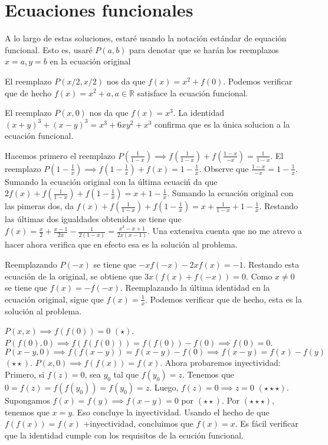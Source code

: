 \section{Ecuaciones funcionales}
A lo largo de estas soluciones, estar\'e usando la notaci\'on est\'andar de equaci\'on funcional. Esto es, usar\'e  $P(a,b)$ para denotar que se har\'an los reemplazos $x = a, y = b$ en la ecuaci\'on original
\begin{sol}
	El reemplazo $P(x/2, x/2)$ nos da que $f(x) = x^2+f(0)$. Podemos verificar que de hecho $f(x) = x^2+a, a \in \mathbb{R}$ satisface la ecuaci\'on funcional.
\end{sol}

\begin{sol}
	El reemplazo $P(x,0)$ nos da que $f(x) = x^3$. La identidad $(x+y)^3 + (x-y)^3 = x^3 +6xy^2+x^3$ confirma que es la \'unica solucion a la ecuaci\'on funcional.
\end{sol}

\begin{sol}
	Hacemos primero el reemplazo $P(\frac{1}{1-x}) \implies f(\frac{1}{1-x}) + f(\frac{1-x}{-x}) = \frac{1}{1-x} $. El reemplazo $P(1-\frac{1}{x}) \implies f(1-\frac{1}{x})+ f(x) = 1-\frac{1}{x}$. Observe que $\frac{1-x}{-x} = 1-\frac{1}{x}$. Sumando la ecuaci\'on original con la \'ultima ecuaci\'n da que $2f(x) + f(\frac{1}{1-x}) + f(1-\frac{1}{x}) = x+1-\frac{1}{x}$. Sumando la ecuaci\'on original con las pimeras dos, da $f(x) +f(\frac{1}{1-x}) + f(1-\frac{1}{x}) = x+\frac{1}{1-x} + 1-\frac{1}{x}$. Restando las \'ultimas dos igualdades obtenidas se tiene que $f(x) = \frac{x}{2} +\frac{x-1}{2x} - \frac{1}{2(1-x)} = \frac{x^3-x+1}{2x(x-1)}$. Una extensiva cuenta que no me atrevo a hacer ahora verifica que en efecto esa es la soluci\'on al problema.
\end{sol}

\begin{sol}
	Reemplazando $P(-x)$ se tiene que $-xf(-x)-2xf(x) =-1$. Restando esta ecuaci\'on de la original, se obtiene que $3x(f(x)+f(-x)) = 0$. Como $x \neq 0$ se tiene que $f(x) = -f(-x)$. Reemplazando la \'ultima identidad en la ecuaci\'on original, sigue que $f(x) = \frac{1}{x}$. Podemos verificar que de hecho, esta es la soluci\'on al problema.
\end{sol}

\begin{sol}
	$P(x,x) \implies f(f(0)) = 0$  $ (\star)$. $P(f(0), 0) \implies f(f(f(0))) = f(f(0)) -f(0) \implies f(0) = 0$. $P(x-y,0) \implies f(f(x-y)) = f(x-y) -f(0) \implies f(x-y) = f(x)-f(y)$ $(\star\star)$. $P(x,0) \implies f(f(x)) = f(x)$.  Ahora probaremos inyectividad: Primero, si $f(z) = 0$, sea $y_{0}$ tal que $f(y_{0}) = z$. Tenemos que $0 = f(z) = f(f(y_{0})) = f(y_{0}) = z$. Luego, $f(z) = 0 \implies z = 0$ $(\star\star\star)$. Supongamos $f(x) = f(y)\implies f(x-y) = 0$ por $(\star\star)$.  Por $(\star\star\star)$, tenemos que $x=y$. Eso concluye la inyectividad. Usando el hecho de que $f(f(x)) = f(x)$ +inyectividad, concluimos que $f(x) = x$. Es f\'acil verificar que la identidad cumple con los requisitos de la ecuci\'on funcional.
\end{sol}

